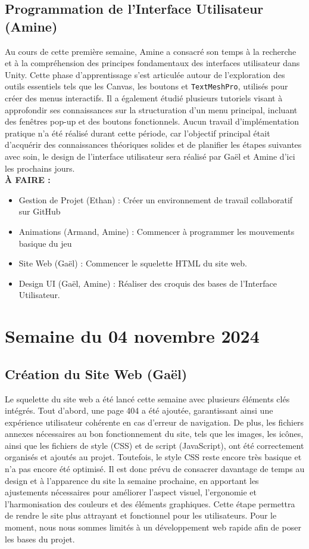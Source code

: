 \documentclass{report}
\begin{document}
\subsection*{Programmation de l'Interface Utilisateur (Amine)}
Au cours de cette première semaine, Amine a consacré son temps à la recherche et à la compréhension des principes fondamentaux des interfaces utilisateur dans Unity. Cette phase d'apprentissage s'est articulée autour de l'exploration des outils essentiels tels que les Canvas, les boutons et \texttt{TextMeshPro}, utilisés pour créer des menus interactifs. Il a également étudié plusieurs tutoriels visant à approfondir ses connaissances sur la structuration d'un menu principal, incluant des fenêtres pop-up et des boutons fonctionnels. Aucun travail d'implémentation pratique n'a été réalisé durant cette période, car l'objectif principal était d'acquérir des connaissances théoriques solides et de planifier les étapes suivantes avec soin, le design de l'interface utilisateur sera réalisé par Gaël et Amine d'ici les prochains jours.
\\[1cm]
\textbf{À FAIRE :}
\begin{itemize}
    \item Gestion de Projet (Ethan) : Créer un environnement de travail collaboratif sur GitHub
    \item Animations (Armand, Amine) : Commencer à programmer les mouvements basique du jeu
    \item Site Web (Gaël) : Commencer le squelette HTML du site web.
    \item Design UI (Gaël, Amine) : Réaliser des croquis des bases de l'Interface Utilisateur.
\end{itemize}

\newpage
\section{Semaine du 04 novembre 2024}

\subsection*{Création du Site Web (Gaël)}
Le squelette du site web a été lancé cette semaine avec plusieurs éléments clés intégrés. Tout d’abord, une page 404 a été ajoutée, garantissant ainsi une expérience utilisateur cohérente en cas d’erreur de navigation. De plus, les fichiers annexes nécessaires au bon fonctionnement du site, tels que les images, les icônes, ainsi que les fichiers de style (CSS) et de script (JavaScript), ont été correctement organisés et ajoutés au projet. Toutefois, le style CSS reste encore très basique et n’a pas encore été optimisé. Il est donc prévu de consacrer davantage de temps au design et à l’apparence du site la semaine prochaine, en apportant les ajustements nécessaires pour améliorer l’aspect visuel, l’ergonomie et l’harmonisation des couleurs et des éléments graphiques. Cette étape permettra de rendre le site plus attrayant et fonctionnel pour les utilisateurs. Pour le moment, nous nous sommes limités à un développement web rapide afin de poser les bases du projet.
\end{document}
